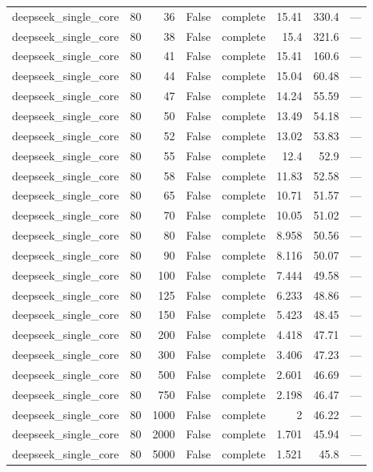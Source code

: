 \begin{tabular}{lrrrlrrl}
deepseek\_single\_core & 80 & 36 & False & complete & 15.41 & 330.4 & — \\
deepseek\_single\_core & 80 & 38 & False & complete & 15.4 & 321.6 & — \\
deepseek\_single\_core & 80 & 41 & False & complete & 15.41 & 160.6 & — \\
deepseek\_single\_core & 80 & 44 & False & complete & 15.04 & 60.48 & — \\
deepseek\_single\_core & 80 & 47 & False & complete & 14.24 & 55.59 & — \\
deepseek\_single\_core & 80 & 50 & False & complete & 13.49 & 54.18 & — \\
deepseek\_single\_core & 80 & 52 & False & complete & 13.02 & 53.83 & — \\
deepseek\_single\_core & 80 & 55 & False & complete & 12.4 & 52.9 & — \\
deepseek\_single\_core & 80 & 58 & False & complete & 11.83 & 52.58 & — \\
deepseek\_single\_core & 80 & 65 & False & complete & 10.71 & 51.57 & — \\
deepseek\_single\_core & 80 & 70 & False & complete & 10.05 & 51.02 & — \\
deepseek\_single\_core & 80 & 80 & False & complete & 8.958 & 50.56 & — \\
deepseek\_single\_core & 80 & 90 & False & complete & 8.116 & 50.07 & — \\
deepseek\_single\_core & 80 & 100 & False & complete & 7.444 & 49.58 & — \\
deepseek\_single\_core & 80 & 125 & False & complete & 6.233 & 48.86 & — \\
deepseek\_single\_core & 80 & 150 & False & complete & 5.423 & 48.45 & — \\
deepseek\_single\_core & 80 & 200 & False & complete & 4.418 & 47.71 & — \\
deepseek\_single\_core & 80 & 300 & False & complete & 3.406 & 47.23 & — \\
deepseek\_single\_core & 80 & 500 & False & complete & 2.601 & 46.69 & — \\
deepseek\_single\_core & 80 & 750 & False & complete & 2.198 & 46.47 & — \\
deepseek\_single\_core & 80 & 1000 & False & complete & 2 & 46.22 & — \\
deepseek\_single\_core & 80 & 2000 & False & complete & 1.701 & 45.94 & — \\
deepseek\_single\_core & 80 & 5000 & False & complete & 1.521 & 45.8 & — \\

\end{tabular}
